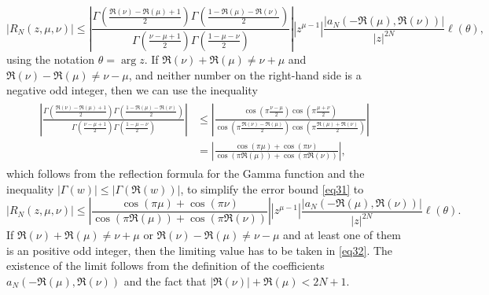 \documentclass[a4paper,twoside,10pt]{amsart}
\numberwithin{equation}{section}
\begin{document}
\begin{equation}\label{eq31}
\left| {R_N \left( {z,\mu ,\nu } \right)} \right| \le  \left|\frac{{\Gamma \left( {\frac{{\Re \left( \nu  \right) - \Re \left( \mu  \right) + 1}}{2}} \right)\Gamma \left( {\frac{{1 - \Re \left( \mu  \right) - \Re \left( \nu  \right)}}{2}} \right)}}{\Gamma \left( {\frac{{\nu  - \mu  + 1}}{2}} \right)\Gamma \left( {\frac{{1 - \mu  - \nu }}{2}} \right)}\right| \left| {z^{\mu  - 1} } \right|\frac{\left|a_N \left( { - \Re \left( \mu  \right),\Re \left( \nu  \right)} \right)\right|}{{\left| z \right|^{2N} }} \ell \left( \theta  \right),
\end{equation}
using the notation $\theta = \arg z$. If $\Re \left( \nu  \right) + \Re \left( \mu  \right) \neq \nu + \mu$ and $\Re \left( \nu  \right) - \Re \left( \mu  \right) \neq \nu - \mu$, and neither number on the right-hand side is a negative odd integer, then we can use the inequality
\begin{gather}\label{eq36}
\begin{split}
\left|\frac{{\Gamma \left( {\frac{{\Re \left( \nu  \right) - \Re \left( \mu  \right) + 1}}{2}} \right)\Gamma \left( {\frac{{1 - \Re \left( \mu  \right) - \Re \left( \nu  \right)}}{2}} \right)}}{\Gamma \left( {\frac{{\nu  - \mu  + 1}}{2}} \right)\Gamma \left( {\frac{{1 - \mu  - \nu }}{2}} \right)}\right|  & \le \left| {\frac{{\cos \left( {\pi \frac{{\nu  - \mu }}{2}} \right)\cos \left( {\pi \frac{{\mu  + \nu }}{2}} \right)}}{{\cos \left( {\pi \frac{{\Re \left( \nu  \right) - \Re \left( \mu  \right)}}{2}} \right)\cos \left( {\pi \frac{{\Re \left( \mu  \right) + \Re \left( \nu  \right)}}{2}} \right)}}} \right| \\
& = \left| {\frac{{\cos \left( {\pi \mu } \right) + \cos \left( {\pi \nu } \right)}}{{\cos \left( {\pi \Re \left( \mu  \right)} \right) + \cos \left( {\pi \Re \left( \nu  \right)} \right)}}} \right|,
\end{split}
\end{gather}
which follows from the reflection formula for the Gamma function and the inequality $\left| {\Gamma \left( w \right)} \right| \le \left| {\Gamma \left( {\Re \left( w \right)} \right)} \right|$, to simplify the error bound \eqref{eq31} to
\begin{equation}\label{eq32}
\left| {R_N \left( {z,\mu ,\nu } \right)} \right| \le \left| {\frac{{\cos \left( {\pi \mu } \right) + \cos \left( {\pi \nu } \right)}}{{\cos \left( {\pi \Re \left( \mu  \right)} \right) + \cos \left( {\pi \Re \left( \nu  \right)} \right)}}} \right|\left| {z^{\mu  - 1} } \right|\frac{\left|a_N \left( { - \Re \left( \mu  \right),\Re \left( \nu  \right)} \right)\right|}{{\left| z \right|^{2N} }} \ell \left( \theta  \right).
\end{equation}
If $\Re \left( \nu  \right) + \Re \left( \mu  \right) \neq \nu + \mu$ or $\Re \left( \nu  \right) - \Re \left( \mu  \right) \neq \nu - \mu$ and at least one of them is an positive odd integer, then the limiting value has to be taken in \eqref{eq32}. The existence of the limit follows from the definition of the coefficients $a_N \left( { - \Re \left( \mu  \right),\Re \left( \nu  \right)} \right)$ and the fact that $\left| {\Re \left( \nu  \right)} \right| + \Re \left( \mu  \right) < 2N + 1$.
\end{document}
